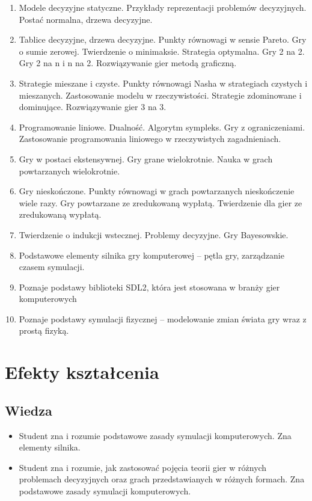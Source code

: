 \documentclass[12pt, a4paper]{article}
\begin{document}
\begin{enumerate}
  \item Modele decyzyjne statyczne. Przykłady reprezentacji problemów decyzyjnych. Postać normalna,  drzewa decyzyjne.
  \item Tablice decyzyjne, drzewa decyzyjne. Punkty równowagi w sensie Pareto. Gry o sumie zerowej.  Twierdzenie o minimaksie. Strategia optymalna. Gry 2 na 2. Gry 2 na n i n na 2. Rozwiązywanie gier metodą graficzną.
  \item Strategie mieszane i czyste. Punkty równowagi Nasha w strategiach czystych i mieszanych. Zastosowanie modelu w rzeczywistości. Strategie zdominowane i dominujące.   Rozwiązywanie gier 3 na 3.
  \item Programowanie liniowe. Dualność. Algorytm sympleks. Gry z ograniczeniami.  Zastosowanie programowania liniowego w rzeczywistych zagadnieniach.
  \item Gry w postaci ekstensywnej. Gry grane wielokrotnie. Nauka w grach powtarzanych wielokrotnie.
  \item Gry nieskończone. Punkty równowagi w grach powtarzanych nieskończenie wiele razy. Gry powtarzane ze zredukowaną wypłatą. Twierdzenie dla gier ze zredukowaną wypłatą.
  \item Twierdzenie o indukcji wstecznej. Problemy decyzyjne.  Gry Bayesowskie.
  \item Podstawowe elementy silnika gry komputerowej – pętla gry, zarządzanie czasem symulacji.
  \item Poznaje podstawy biblioteki SDL2, która jest stosowana w branży gier komputerowych
  \item Poznaje podstawy symulacji fizycznej – modelowanie zmian świata gry wraz z prostą fizyką.
\end{enumerate}

\section{Efekty kształcenia}

\subsection*{Wiedza}
\begin{itemize}
  \item Student zna i rozumie podstawowe zasady symulacji komputerowych. Zna elementy silnika.
  \item Student zna i rozumie, jak zastosować pojęcia teorii gier w różnych problemach decyzyjnych oraz grach przedstawianych w różnych formach.  Zna podstawowe zasady symulacji komputerowych.
\end{itemize}
\end{document}
